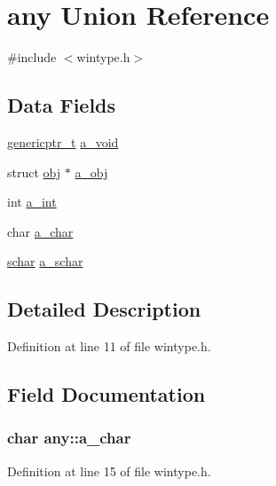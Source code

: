 \hypertarget{unionany}{\section{any Union Reference}
\label{unionany}
}


{\ttfamily \#include $<$wintype.\+h$>$}

\subsection*{Data Fields}
\begin{DoxyCompactItemize}
\item 
\hyperlink{tradstdc_8h_ad4a7dab7269b4b00e3c7c7d2e66f31cd}{genericptr\+\_\+t} \hyperlink{unionany_a570c320f6790aab4b51733abc54827d7}{a\+\_\+void}
\item 
struct \hyperlink{structobj}{obj} $\ast$ \hyperlink{unionany_a0b581808e661444ae19a63a5ccdbf367}{a\+\_\+obj}
\item 
int \hyperlink{unionany_aae9fa40e12da390154868ea24a96c561}{a\+\_\+int}
\item 
char \hyperlink{unionany_a300fbd3f59d18c748876214b70f75a25}{a\+\_\+char}
\item 
\hyperlink{config_8h_a0fd9ce9d735064461bebfe6037026093}{schar} \hyperlink{unionany_aba152669b54e0e5aa1a9c665be6abcb0}{a\+\_\+schar}
\end{DoxyCompactItemize}


\subsection{Detailed Description}


Definition at line 11 of file wintype.\+h.



\subsection{Field Documentation}
\hypertarget{unionany_a300fbd3f59d18c748876214b70f75a25}{
\subsubsection[{a\+\_\+char}]{\setlength{\rightskip}{0pt plus 5cm}char any\+::a\+\_\+char}}\label{unionany_a300fbd3f59d18c748876214b70f75a25}


Definition at line 15 of file wintype.\+h.



